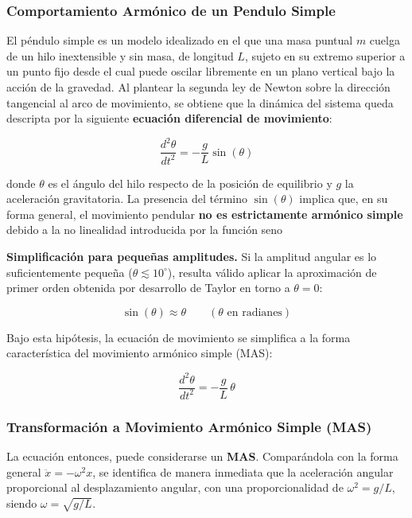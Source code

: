 \subsubsection{Comportamiento Armónico de un Pendulo Simple}

El péndulo simple es un modelo idealizado en el que una masa puntual $m$ cuelga de un hilo inextensible y sin masa, de longitud $L$, sujeto en su extremo superior a un punto fijo desde el cual puede oscilar libremente en un plano vertical bajo la acción de la gravedad. Al plantear la segunda ley de Newton sobre la dirección tangencial al arco de movimiento, se obtiene que la dinámica del sistema queda descripta por la siguiente \textbf{ecuación diferencial de movimiento}:

\begin{equation}
    \frac{d^2\theta}{dt^2} = -\frac{g}{L}\sin(\theta)
\end{equation}

donde $\theta$ es el ángulo del hilo respecto de la posición de equilibrio y $g$ la aceleración gravitatoria. La presencia del término $\sin(\theta)$ implica que, en su forma general, el movimiento pendular \textbf{no es estrictamente armónico simple} debido a la no linealidad introducida por la función seno

\textbf{Simplificación para pequeñas amplitudes.}
Si la amplitud angular es lo suficientemente pequeña ($\theta \lesssim 10^\circ$), resulta válido aplicar la aproximación de primer orden obtenida por desarrollo de Taylor en torno a $\theta = 0$:

\begin{equation}
    \sin(\theta) \approx \theta \qquad (\theta \text{ en radianes})
\end{equation}

Bajo esta hipótesis, la ecuación de movimiento se simplifica a la forma característica del movimiento armónico simple (MAS):

\begin{equation}
    \frac{d^2\theta}{dt^2} = -\frac{g}{L}\,\theta
\end{equation}

\subsubsection{Transformación a Movimiento Armónico Simple (MAS)}

La ecuación entonces, puede considerarse un \textbf{MAS}. Comparándola con la forma general $\ddot{x} = -\omega^2 x$, se identifica de manera inmediata que la aceleración angular proporcional al desplazamiento angular, con una proporcionalidad de
$\omega^2 = g/L$, siendo $\omega = \sqrt{g/L}$.

